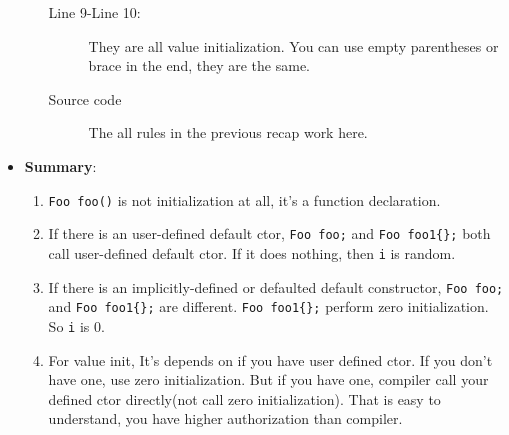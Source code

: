 \documentclass[a4paper,11pt,twoside]{book}
\begin{document}
\begin{itemize}
\begin{enumerate}
\begin{description}
	\item[Line 9-Line 10:] They are all value initialization. You can use empty parentheses or brace in the end, they are the same. 
	
	\item[Source code] The all rules in the previous recap work here. 
\end{description}		

	\end{enumerate}
		
\item \textbf{Summary}:
\begin{enumerate}
	\item \texttt{Foo foo()} is not initialization at all, it's a function declaration. 
	
	\item If there is an user-defined default ctor, \texttt{Foo foo;} and \texttt{Foo foo1\{\};} both call user-defined default ctor. If it does nothing, then \texttt{i} is random.
	
	\item If there is an implicitly-defined or defaulted default constructor, \texttt{Foo foo;} and \texttt{Foo foo1\{\};} are different. \texttt{Foo foo1\{\};} perform zero initialization. So \texttt{i} is 0. 
	
	\item For value init, It's depends on if you have user defined ctor. If you don't have one, use zero initialization. But if you have one, compiler call your defined ctor directly(not call zero initialization). That is easy to understand, you have higher authorization than compiler. 
\end{enumerate}

\end{itemize}
\end{document}
